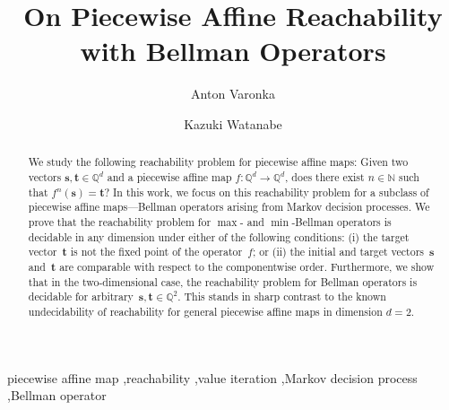 \documentclass[preprint,12pt]{elsarticle}
\theoremstyle{plain}
\theoremstyle{definition}
\theoremstyle{remark}
\theoremstyle{claimstyle}
\newcommand{\QQ}{\mathbb{Q}}
\newcommand{\NN}{\mathbb{N}}
\begin{document}
\begin{frontmatter}



\title{On Piecewise Affine Reachability\\ with Bellman Operators}


\author[label:tu]{Anton Varonka} %
\author[label:nii,label:sokendai]{Kazuki Watanabe} %
\begin{abstract}
 We study the following reachability problem for piecewise affine maps: Given two vectors $\bm{s}, \bm{t} \in \QQ^d$ and a piecewise affine map $f\colon \QQ^d\rightarrow \QQ^d$, does there exist $n\in \NN$ such that $f^{n}(\bm{s}) = \bm{t}$?
In this work, we focus on  this reachability problem for a subclass of piecewise affine maps---Bellman operators arising from Markov decision processes. 
 We prove that the reachability problem for $\max$- and $\min$-Bellman operators is decidable in any dimension under either of the following conditions: (i) the target vector~$\bm{t}$ is not the fixed point of the operator~$f$; or (ii) the initial and target vectors~$\bm{s}$ and~$\bm{t}$ are comparable with respect to the componentwise order.
Furthermore, we show that in the two-dimensional case, the reachability problem for Bellman operators is decidable for arbitrary~$\bm{s}, \bm{t} \in \QQ^2$.
This stands in sharp contrast to the known undecidability of reachability for general piecewise affine maps in dimension $d = 2$. 
\end{abstract}



\begin{keyword}
piecewise affine map \sep reachability \sep value iteration \sep Markov decision process \sep Bellman operator



\end{keyword}

\end{frontmatter}
\end{document}
